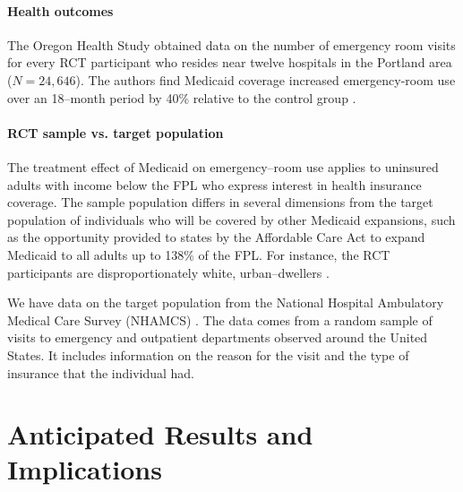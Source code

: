 \documentclass{article}
\begin{document}

\paragraph{Health outcomes} 

The Oregon Health Study obtained data on the number of emergency room visits for every RCT participant who resides near twelve hospitals in the Portland area ($N=24,646$). The authors find Medicaid coverage increased emergency-room use over an 18--month period by 40\% relative to the control group \cite{Taubman}. \\
 
\paragraph{RCT sample vs. target population}

The treatment effect of Medicaid on emergency--room use applies to uninsured adults with income below the FPL who express interest in health insurance coverage. The sample population differs in several dimensions from the target population of individuals who will be covered by other Medicaid expansions, such as the opportunity provided to states by the Affordable Care Act to expand Medicaid to all adults up to 138\% of the FPL. For instance, the RCT participants are disproportionately white, urban--dwellers \cite{Taubman}. 
 
We have data on the target population from the National Hospital Ambulatory Medical Care Survey (NHAMCS) \cite{NHAMCS}.  The data comes from a random sample of visits to emergency and outpatient departments observed around the United States.  It includes information on the reason for the visit and the type of insurance that the individual had. %

\section{Anticipated Results and Implications}




\end{document}
